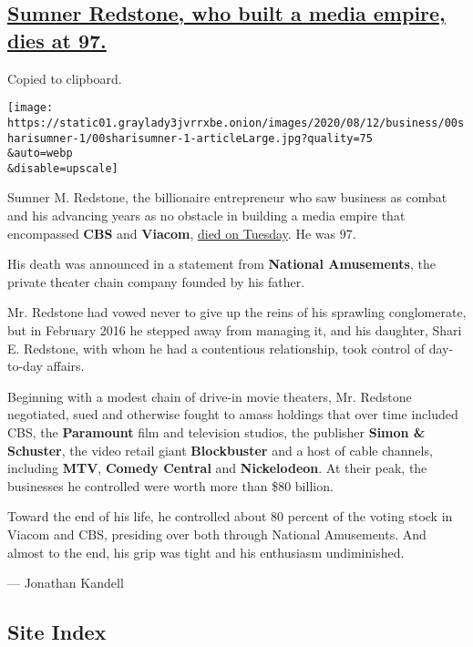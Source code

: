 \hypertarget{sumner-redstone-who-built-a-media-empire-dies-at-97}{%
\subsection{\texorpdfstring{\protect\hyperlink{sumner-redstone-who-built-a-media-empire-dies-at-97}{Sumner
Redstone, who built a media empire, dies at
97.}}{Sumner Redstone, who built a media empire, dies at 97.}}\label{sumner-redstone-who-built-a-media-empire-dies-at-97}}

Copied to clipboard.

\texttt{[image: https://static01.graylady3jvrrxbe.onion/images/2020/08/12/business/00sharisumner-1/00sharisumner-1-articleLarge.jpg?quality=75\\\&auto=webp\\\&disable=upscale]}

Sumner M. Redstone, the billionaire entrepreneur who saw business as
combat and his advancing years as no obstacle in building a media empire
that encompassed \textbf{CBS} and \textbf{Viacom},
\href{https://www.nytimes3xbfgragh.onion/2020/08/12/obituaries/sumner-redstone-dead.html}{died
on Tuesday}. He was 97.

His death was announced in a statement from \textbf{National
Amusements}, the private theater chain company founded by his father.

Mr. Redstone had vowed never to give up the reins of his sprawling
conglomerate, but in February 2016 he stepped away from managing it, and
his daughter, Shari E. Redstone, with whom he had a contentious
relationship, took control of day-to-day affairs.

Beginning with a modest chain of drive-in movie theaters, Mr. Redstone
negotiated, sued and otherwise fought to amass holdings that over time
included CBS, the \textbf{Paramount} film and television studios, the
publisher \textbf{Simon \& Schuster}, the video retail giant
\textbf{Blockbuster} and a host of cable channels, including
\textbf{MTV}, \textbf{Comedy Central} and \textbf{Nickelodeon}. At their
peak, the businesses he controlled were worth more than \$80 billion.

Toward the end of his life, he controlled about 80 percent of the voting
stock in Viacom and CBS, presiding over both through National
Amusements. And almost to the end, his grip was tight and his enthusiasm
undiminished.

--- Jonathan Kandell

\hypertarget{site-index}{%
\subsection{Site Index}\label{site-index}}

